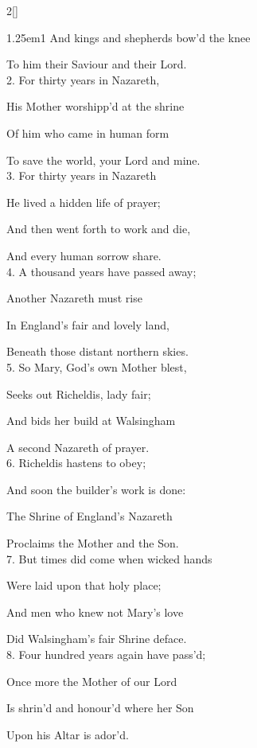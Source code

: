 \begin{paracol}{2}[]
\begin{hangparas}{1.25em}{1}
And kings and shepherds bow'd the knee\par
To him their Saviour and their Lord.\\

2. For thirty years in Nazareth,\par
His Mother worshipp'd at the shrine\par
Of him who came in human form\par
To save the world, your Lord and mine.\\

3. For thirty years in Nazareth\par
He lived a hidden life of prayer;\par
And then went forth to work and die,\par
And every human sorrow share.\\

4. A thousand years have passed away;\par
Another Nazareth must rise\par
In England’s fair and lovely land,\par
Beneath those distant northern skies.\\

5. So Mary, God's own Mother blest,\par
Seeks out Richeldis, lady fair;\par
And bids her build at Walsingham\par
A second Nazareth of prayer.\\

6. Richeldis hastens to obey;\par
And soon the builder's work is done:\par
The Shrine of England's Nazareth\par
Proclaims the Mother and the Son.\\

7. But times did come when wicked hands\par
Were laid upon that holy place;\par
And men who knew not Mary's love\par
Did Walsingham's fair Shrine deface.\\

8. Four hundred years again have pass'd;\par
Once more the Mother of our Lord\par
Is shrin'd and honour'd where her Son\par
Upon his Altar is ador'd.\\


\end{hangparas}
\end{paracol}
